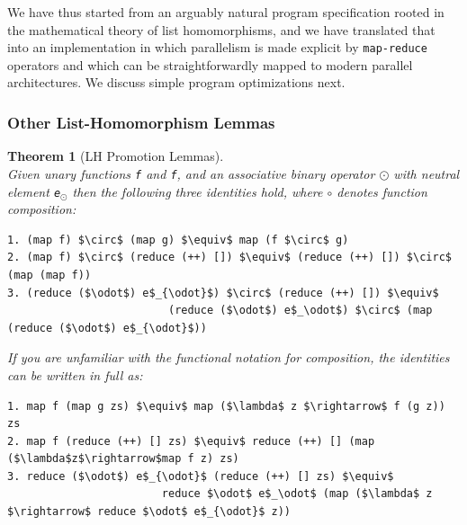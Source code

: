 \documentclass[acmsmall,review]{acmart}\settopmatter{printfolios=true,printccs=false,printacmref=false}
\newtheorem{mytheo}{Theorem}
\begin{document}
We have thus started from an arguably natural program specification rooted 
in the mathematical theory of list homomorphisms, and we have translated
that into an implementation in which parallelism is made explicit by
\lstinline{map-reduce} operators and which can be straightforwardly
mapped to modern parallel architectures. We discuss simple program
optimizations next.

\subsubsection{Other List-Homomorphism Lemmas}

\begin{mytheo}[LH Promotion Lemmas]\label{LH-PROMS}
$\mbox{ }$\\
Given unary functions \lstinline{f} and \lstinline{f}, and an 
associative binary operator $\odot$ with neutral element {\tt e$_{\odot}$}
then the following three identities hold, where $\circ$ denotes 
function composition:\\
\begin{lstlisting}[mathescape=true]
1. (map f) $\circ$ (map g) $\equiv$ map (f $\circ$ g)
2. (map f) $\circ$ (reduce (++) []) $\equiv$ (reduce (++) []) $\circ$ (map (map f))
3. (reduce ($\odot$) e$_{\odot}$) $\circ$ (reduce (++) []) $\equiv$
                         (reduce ($\odot$) e$_\odot$) $\circ$ (map (reduce ($\odot$) e$_{\odot}$)) 
\end{lstlisting}
If you are unfamiliar with the functional notation for composition, 
the identities can be written in full as:\\
\begin{lstlisting}[mathescape=true]
1. map f (map g zs) $\equiv$ map ($\lambda$ z $\rightarrow$ f (g z)) zs
2. map f (reduce (++) [] zs) $\equiv$ reduce (++) [] (map ($\lambda$z$\rightarrow$map f z) zs)
3. reduce ($\odot$) e$_{\odot}$ (reduce (++) [] zs) $\equiv$ 
                        reduce $\odot$ e$_\odot$ (map ($\lambda$ z $\rightarrow$ reduce $\odot$ e$_{\odot}$ z)) 
\end{lstlisting}\vspace{-2ex}
\end{mytheo}
\end{document}
